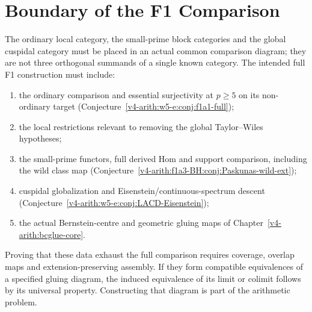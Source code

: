 \section{Boundary of the F1 Comparison}
\label{v4-arith:w5-e:residuals}

\begin{conjecture}
\label{v4-arith:w5-e:prop:F1-table-refined}
The ordinary local category, the small-prime block categories and the
global cuspidal category must be placed in an actual common comparison
diagram; they are not three orthogonal summands of a single known
category. The intended full F1 construction must include:
\begin{enumerate}
\item the ordinary comparison and essential surjectivity at $p\ge5$
on its non-ordinary target
(Conjecture~\ref{v4-arith:w5-e:conj:f1a1-full});
\item the local restrictions relevant to removing the global
Taylor--Wiles hypotheses;
\item the small-prime functors, full derived Hom and support comparison,
including the wild class map
(Conjecture~\ref{v4-arith:f1a3-BH:conj:Paskunas-wild-ext});
\item cuspidal globalization and Eisenstein/continuous-spectrum descent
(Conjecture~\ref{v4-arith:w5-e:conj:LACD-Eisenstein});
\item the actual Bernstein-centre and geometric gluing maps of
Chapter~\ref{v4-arith:bcglue-core}.
\end{enumerate}
Proving that these data exhaust the full comparison requires coverage,
overlap maps and extension-preserving assembly. If they form compatible
equivalences of a specified gluing diagram, the induced equivalence
of its limit or colimit follows by its universal property. Constructing
that diagram is part of the arithmetic problem.
\end{conjecture}
